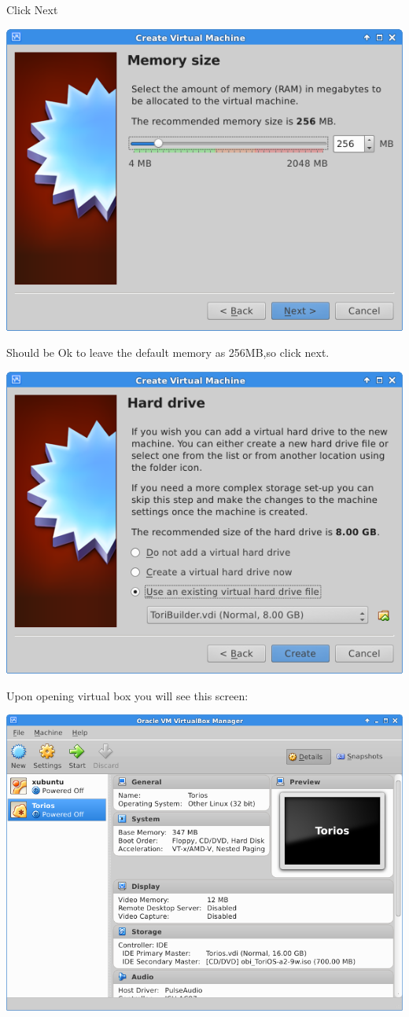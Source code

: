 \documentclass[12pt,a4paper]{book}
\begin{document}
Click Next

\begin{center}
\includegraphics[width=0.7\linewidth]{ToriosTest02}
\end{center}

Should be Ok to leave the default memory as 256MB,so click next.

\begin{center}
\includegraphics[width=0.7\linewidth]{ToriosTest03}
\end{center}

Upon opening virtual box you will see this screen:
\begin{center}
\includegraphics[width=0.7\linewidth]{virtualbox}
\end{center}
\end{document}
